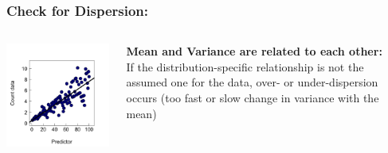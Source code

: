 \documentclass{beamer}
\begin{document}
\begin{frame}
    \frametitle{Check for Dispersion:}
    \begin{columns}
        \begin{column}{0.5\textwidth}
            \includegraphics[width=\textwidth]{lectures/day_9_refreshing_glm/figures/unnamed-chunk-27-1.png}
        \end{column}
        \begin{column}{0.5\textwidth}
           \textbf{Mean and Variance are related to each other:}\\
            If the distribution-specific relationship is not the assumed one for the data, over- or under-dispersion occurs (too fast or slow change in variance with the mean)
        \end{column}
    \end{columns}
\end{frame}
\end{document}
